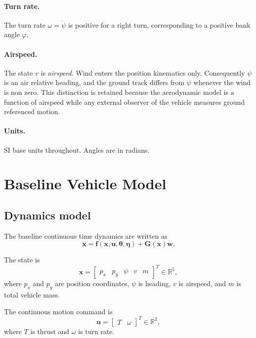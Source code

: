 \documentclass[11pt,a4paper]{article}
\newcommand{\R}{\mathbb{R}}
\newcommand{\vecx}{\bm{x}}
\newcommand{\vecu}{\bm{u}}
\newcommand{\vecw}{\bm{w}}
\newcommand{\vectheta}{\bm{\theta}}
\newcommand{\veceta}{\bm{\eta}}
\newcommand{\vecf}{\bm{f}}
\newcommand{\matG}{\bm{G}}
\begin{document}
\paragraph{Turn rate.}
The turn rate $\omega = \dot\psi$ is positive for a right turn, corresponding to
a positive bank angle $\varphi$.

\paragraph{Airspeed.}
The state $v$ is \emph{airspeed}. Wind enters the position kinematics only.
Consequently $\psi$ is an air relative heading, and the ground track differs from
$\psi$ whenever the wind is non zero. This distinction is retained because the
aerodynamic model is a function of airspeed while any external observer of the
vehicle measures ground referenced motion.

\paragraph{Units.}
SI base units throughout. Angles are in radians.

\section{Baseline Vehicle Model}

\subsection{Dynamics model}

The baseline continuous time dynamics are written as
\begin{equation}
  \dot{\vecx} = \vecf(\vecx, \vecu, \vectheta, \veceta) + \matG(\vecx)\vecw .
  \label{eq:baseline-dynamics}
\end{equation}

The state is
\begin{equation}
  \vecx = \begin{bmatrix} p_x & p_y & \psi & v & m \end{bmatrix}^{T} \in \R^{5},
\end{equation}
where $p_x$ and $p_y$ are position coordinates, $\psi$ is heading, $v$ is
airspeed, and $m$ is total vehicle mass.

The continuous motion command is
\begin{equation}
  \vecu = \begin{bmatrix} T & \omega \end{bmatrix}^{T} \in \R^{2},
\end{equation}
where $T$ is thrust and $\omega$ is turn rate.
\end{document}

